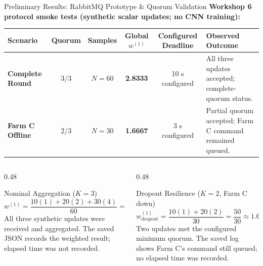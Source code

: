 \documentclass[aspectratio=169]{beamer}
\begin{document}
\begin{frame}{Preliminary Results: RabbitMQ Prototype \& Quorum Validation}
    \textbf{Workshop 6 protocol smoke tests (synthetic scalar updates; no CNN training):}
    \vspace{0.05cm}
    \begin{center}
    \scriptsize
    \setlength{\tabcolsep}{3.5pt}
    \renewcommand{\arraystretch}{1.2}
    \begin{tabular}{@{} l c c c c p{3.5cm} @{}}
        \toprule
        \textbf{Scenario} & \textbf{Quorum} & \textbf{Samples} & \textbf{Global $w^{(1)}$} & \textbf{Configured Deadline} & \textbf{Observed Outcome} \\
        \midrule
        \textbf{Complete Round} & $3/3$ & $N{=}60$ & \textbf{2.8333} & 10 s configured & All three updates accepted; complete-quorum status. \\
        \textbf{Farm C Offline} & $2/3$ & $N{=}30$ & \textbf{1.6667} & 3 s configured & Partial quorum accepted; Farm C command remained queued. \\
        \bottomrule
    \end{tabular}
    \end{center}
    \vspace{0.05cm}
    \begin{columns}[T]
        \begin{column}{0.48\textwidth}
            \begin{exampleblock}{Nominal Aggregation ($K=3$)}
                \scriptsize
                \[
                w^{(1)} = \frac{10(1) + 20(2) + 30(4)}{60} = \frac{170}{60} \approx \mathbf{2.8333}
                \]
                All three synthetic updates were received and aggregated. The saved JSON records the weighted result; elapsed time was not recorded.
            \end{exampleblock}
        \end{column}
        \begin{column}{0.48\textwidth}
            \begin{alertblock}{Dropout Resilience ($K=2$, Farm C down)}
                \scriptsize
                \[
                w^{(1)}_{\text{dropout}} = \frac{10(1) + 20(2)}{30} = \frac{50}{30} \approx \mathbf{1.6667}
                \]
                Two updates met the configured minimum quorum. The saved log shows Farm C's command still queued; no elapsed time was recorded.
            \end{alertblock}
        \end{column}
    \end{columns}
\end{frame}
\end{document}
